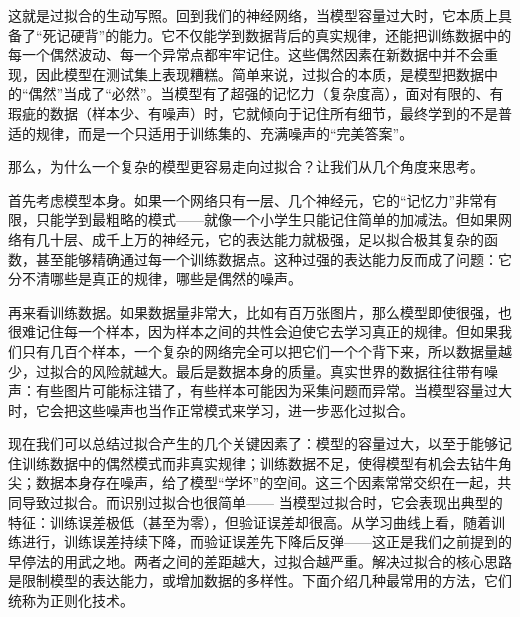 \documentclass[lang=cn,zihao=-4,a4paper,fontset=windows]{beautybook}
\begin{document}
这就是过拟合的生动写照。回到我们的神经网络，当模型容量过大时，它本质上具备了“死记硬背”的能力。它不仅能学到数据背后的真实规律，还能把训练数据中的每一个偶然波动、每一个异常点都牢牢记住。这些偶然因素在新数据中并不会重现，因此模型在测试集上表现糟糕。简单来说，过拟合的本质，是模型把数据中的“偶然”当成了“必然”。当模型有了超强的记忆力（复杂度高），面对有限的、有瑕疵的数据（样本少、有噪声）时，它就倾向于记住所有细节，最终学到的不是普适的规律，而是一个只适用于训练集的、充满噪声的“完美答案”。

那么，为什么一个复杂的模型更容易走向过拟合？让我们从几个角度来思考。

首先考虑模型本身。如果一个网络只有一层、几个神经元，它的“记忆力”非常有限，只能学到最粗略的模式——就像一个小学生只能记住简单的加减法。但如果网络有几十层、成千上万的神经元，它的表达能力就极强，足以拟合极其复杂的函数，甚至能够精确通过每一个训练数据点。这种过强的表达能力反而成了问题：它分不清哪些是真正的规律，哪些是偶然的噪声。

再来看训练数据。如果数据量非常大，比如有百万张图片，那么模型即使很强，也很难记住每一个样本，因为样本之间的共性会迫使它去学习真正的规律。但如果我们只有几百个样本，一个复杂的网络完全可以把它们一个个背下来，所以数据量越少，过拟合的风险就越大。最后是数据本身的质量。真实世界的数据往往带有噪声：有些图片可能标注错了，有些样本可能因为采集问题而异常。当模型容量过大时，它会把这些噪声也当作正常模式来学习，进一步恶化过拟合。

现在我们可以总结过拟合产生的几个关键因素了：模型的容量过大，以至于能够记住训练数据中的偶然模式而非真实规律；训练数据不足，使得模型有机会去钻牛角尖；数据本身存在噪声，给了模型“学坏”的空间。这三个因素常常交织在一起，共同导致过拟合。而识别过拟合也很简单——
当模型过拟合时，它会表现出典型的特征：训练误差极低（甚至为零），但验证误差却很高。从学习曲线上看，随着训练进行，训练误差持续下降，而验证误差先下降后反弹——这正是我们之前提到的早停法的用武之地。两者之间的差距越大，过拟合越严重。解决过拟合的核心思路是限制模型的表达能力，或增加数据的多样性。下面介绍几种最常用的方法，它们统称为正则化技术。
\end{document}
